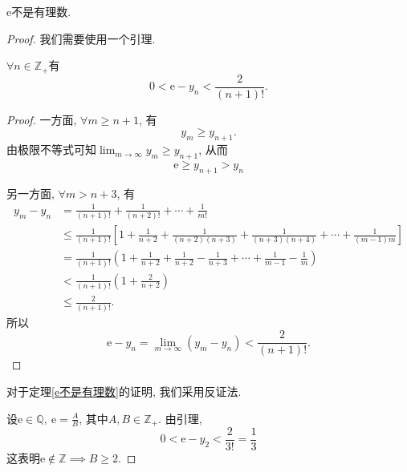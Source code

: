 \begin{theorem}\label{e不是有理数}
    $\mathrm{e}$不是有理数.
\end{theorem}
\begin{proof}
    我们需要使用一个引理.
    \begin{lemma}
        $\forall n\in \mathbb{Z} _{+}$有
        \begin{equation}
            0<\mathrm{e}-y_n< \frac{2}{(n+1)!}.
        \end{equation}
    \end{lemma}
    \begin{proof}
        一方面, $\forall m\ge n+1$, 有
        \begin{equation}
          y_m \ge y_{n+1}.
        \end{equation}
        由极限不等式可知$\displaystyle \lim_{m \to \infty}y_m \ge y_{n+1}$, 从而
        \begin{equation}
          \mathrm{e}\ge y_{n+1} >y_n
        \end{equation}

        另一方面, $\forall m > n+3$, 有
        \begin{align}
            y_{m} - y_n & = \frac{1}{(n+1)!} + \frac{1}{(n+2)!}+ \cdots + \frac{1}{m!}
            \\
            & \le \frac{1}{(n+1)!}\left[ 1 + \frac{1}{n+2} + \frac{1}{(n+2)(n+3)} + \frac{1}{(n+3)(n+4)} + \cdots + \frac{1}{(m-1)m} \right]
            \\
            & = \frac{1}{(n+1)!} \left( 1 + \frac{1}{n+2} + \frac{1}{n+2} - \frac{1}{n+3} + \cdots + \frac{1}{m-1} - \frac{1}{m} \right) 
            \\
            & < \frac{1}{(n+1)!} \left( 1+\frac{2}{n+2} \right) 
            \\
            & \le \frac{2}{(n+1)!}  .
        \end{align}
        所以
        \begin{equation}
          \mathrm{e}-y_n = \lim_{m \to \infty}(y_m - y_n) < \frac{2}{(n+1)!}.
        \end{equation}
    \end{proof}
    
    对于定理\ref{e不是有理数}的证明, 我们采用反证法. 

    设$\mathrm{e} \in \mathbb{Q}, \ \mathrm{e} = \frac{A}{B}$, 其中$A,B \in \mathbb{Z}_{+}$.
    由引理, 
    \begin{equation}
      0 < \mathrm{e} - y_2 < \frac{2}{3!} = \frac{1}{3}
    \end{equation}
    这表明$\mathrm{e} \notin \mathbb{Z} \implies B \ge 2$.


\end{proof}
